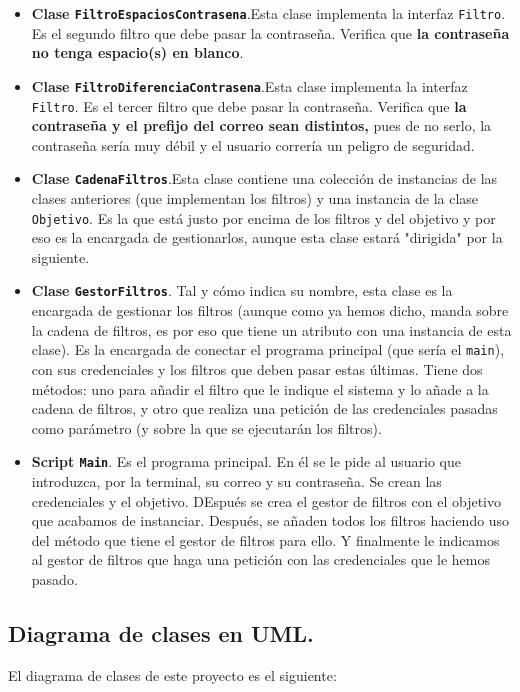 \documentclass[a4paper,12pt]{article}
\begin{document}
\begin{itemize}
				\item \textbf{Clase \texttt{FiltroEspaciosContrasena}}.Esta clase implementa la interfaz \texttt{Filtro}.  Es el segundo filtro que debe pasar la contraseña. Verifica que \textbf{la contraseña no tenga espacio(s) en blanco}.  
				
				\item \textbf{Clase \texttt{FiltroDiferenciaContrasena}}.Esta clase implementa la interfaz \texttt{Filtro}.  Es el tercer filtro que debe pasar la contraseña. Verifica que \textbf{la contraseña y el prefijo del correo sean distintos,} pues de no serlo, la contraseña sería muy débil y el usuario correría un peligro de seguridad.  
				
				\item \textbf{Clase \texttt{CadenaFiltros}}.Esta clase contiene una colección de instancias de las clases anteriores (que implementan los filtros) y una instancia de la clase \texttt{Objetivo}. Es la que está justo por encima de los filtros y del objetivo y por eso es la encargada de gestionarlos, aunque esta clase estará "dirigida" por la siguiente.
				
				\item \textbf{Clase \texttt{GestorFiltros}}. Tal y cómo indica su nombre, esta clase es la encargada de gestionar los filtros (aunque como ya hemos dicho, manda sobre la cadena de filtros, es por eso que tiene un atributo con una instancia de esta clase). Es la encargada de conectar el programa principal (que sería el \texttt{main}), con sus credenciales y los filtros que deben pasar estas últimas. Tiene dos métodos: uno para añadir el filtro que le indique el sistema y lo añade a la cadena de filtros, y otro que realiza una petición de las credenciales pasadas como parámetro (y sobre la que se ejecutarán los filtros).
				
				\item \textbf{Script \texttt{Main}}. Es el programa principal. En él se le pide al usuario que introduzca, por la terminal, su correo y su contraseña. Se crean las credenciales y el objetivo. DEspués se crea el gestor de filtros con el objetivo que acabamos de instanciar. Después, se añaden todos los filtros haciendo uso del método que tiene el gestor de filtros para ello. Y finalmente le indicamos al gestor de filtros que haga una petición con las credenciales que le hemos pasado.
			\end{itemize}
			
		\subsection{Diagrama de clases en UML.}
			El diagrama de clases de este proyecto es el siguiente:
			
\end{document}
